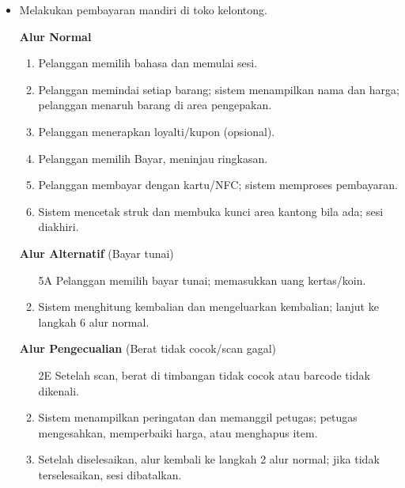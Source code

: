 \documentclass[a4paper]{article}
\begin{document}
\begin{enumerate}[itemsep=1em]
\begin{itemize}[itemsep=1em]
    \item Melakukan pembayaran mandiri di toko kelontong.


    \vspace{1em}

    \textbf{Alur Normal}
    \begin{enumerate}[nosep]
      \item Pelanggan memilih bahasa dan memulai sesi.
      \item Pelanggan memindai setiap barang; sistem menampilkan nama dan harga; pelanggan menaruh barang di area pengepakan.
      \item Pelanggan menerapkan loyalti/kupon (opsional).
      \item Pelanggan memilih Bayar, meninjau ringkasan.
      \item Pelanggan membayar dengan kartu/NFC; sistem memproses pembayaran.
      \item Sistem mencetak struk dan membuka kunci area kantong bila ada; sesi diakhiri.
    \end{enumerate}

    \vspace{1em}

    \textbf{Alur Alternatif} (Bayar tunai)
    \begin{enumerate}[nosep]
      \item[5A] Pelanggan memilih bayar tunai; memasukkan uang kertas/koin.
      \item Sistem menghitung kembalian dan mengeluarkan kembalian; lanjut ke langkah 6 alur normal.
    \end{enumerate}

    \vspace{1em}

    \textbf{Alur Pengecualian} (Berat tidak cocok/scan gagal)
    \begin{enumerate}[nosep]
      \item[2E] Setelah scan, berat di timbangan tidak cocok atau barcode tidak dikenali.
      \item Sistem menampilkan peringatan dan memanggil petugas; petugas mengesahkan, memperbaiki harga, atau menghapus item.
      \item Setelah diselesaikan, alur kembali ke langkah 2 alur normal; jika tidak terselesaikan, sesi dibatalkan.
    \end{enumerate}


\end{itemize}
\end{enumerate}
\end{document}
